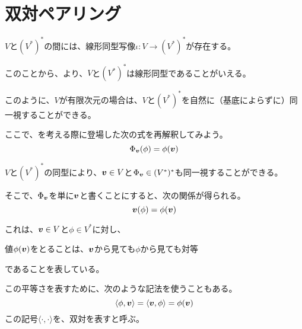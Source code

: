 \documentclass[../../../topic_linear-algebra]{subfiles}
\begin{document}
\sectionline
\section{双対ペアリング}

$V$と$(V^*)^*$の間には、線形同型写像$\iota \colon V \to (V^*)^*$が存在する。

このことから、より、$V$と$(V^*)^*$は線形同型であることがいえる。

\br

このように、$V$が有限次元の場合は、$V$と$(V^*)^*$を自然に（基底によらずに）同一視することができる。

\br

ここで、を考える際に登場した次の式を再解釈してみよう。
\begin{equation*}
  \Phi_{\vb*{v}}(\phi) = \phi(\vb*{v})
\end{equation*}

$V$と$(V^*)^*$の同型により、$\vb*{v} \in V$と$\Phi_{\vb*{v}} \in (V^*)^*$も同一視することができる。

そこで、$\Phi_{\vb*{v}}$を単に$\vb*{v}$と書くことにすると、次の関係が得られる。
\begin{equation*}
  \vb*{v}(\phi) = \phi(\vb*{v})
\end{equation*}

これは、$\vb*{v} \in V$と$\phi \in V^*$に対し、
\begin{emphabox}
  \begin{spacebox}
    \begin{center}
      値$\phi(\vb*{v})$をとることは、$\vb*{v}$から見ても$\phi$から見ても対等
    \end{center}
  \end{spacebox}
\end{emphabox}
であることを表している。

\br

この平等さを表すために、次のような記法を使うこともある。
\begin{equation*}
  \langle \phi, \vb*{v} \rangle = \langle \vb*{v}, \phi \rangle = \phi(\vb*{v})
\end{equation*}
この記号$\langle \cdot, \cdot \rangle$を、双対を表すと呼ぶ。
\end{document}

